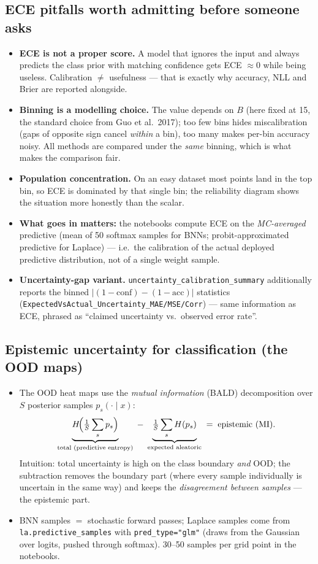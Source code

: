 \documentclass[10pt,a4paper]{article}
\newcommand{\code}[1]{\texttt{#1}}
\begin{document}
\subsection{ECE pitfalls worth admitting before someone asks}
\begin{itemize}
\item \textbf{ECE is not a proper score.} A model that ignores the input and always predicts the
  class prior with matching confidence gets ECE $\approx 0$ while being useless. Calibration
  $\ne$ usefulness --- that is exactly why accuracy, NLL and Brier are reported alongside.
\item \textbf{Binning is a modelling choice.} The value depends on $B$ (here fixed at 15,
  the standard choice from Guo et al.\ 2017); too few bins hides miscalibration
  (gaps of opposite sign cancel \emph{within} a bin), too many makes per-bin accuracy noisy.
  All methods are compared under the \emph{same} binning, which is what makes the comparison fair.
\item \textbf{Population concentration.} On an easy dataset most points land in the top bin, so ECE
  is dominated by that single bin; the reliability diagram shows the situation more honestly than
  the scalar.
\item \textbf{What goes in matters:} the notebooks compute ECE on the \emph{MC-averaged} predictive
  (mean of 50 softmax samples for BNNs; probit-approximated predictive for Laplace) --- i.e.\ the
  calibration of the actual deployed predictive distribution, not of a single weight sample.
\item \textbf{Uncertainty-gap variant.} \code{uncertainty\_calibration\_summary} additionally
  reports the binned $|(1-\mathrm{conf})-(1-\mathrm{acc})|$ statistics
  (\code{ExpectedVsActual\_Uncertainty\_MAE/MSE/Corr}) --- same information as ECE, phrased as
  ``claimed uncertainty vs.\ observed error rate''.
\end{itemize}

\subsection{Epistemic uncertainty for classification (the OOD maps)}
\begin{itemize}
\item The OOD heat maps use the \emph{mutual information} (BALD) decomposition over $S$ posterior
  samples $p_s(\cdot\mid x)$:
  \[
  \underbrace{H\!\Bigl(\tfrac1S\sum_s p_s\Bigr)}_{\text{total (predictive entropy)}}
  \;-\;
  \underbrace{\tfrac1S\sum_s H(p_s)}_{\text{expected aleatoric}}
  \;=\;
  \text{epistemic (MI)} .
  \]
  Intuition: total uncertainty is high on the class boundary \emph{and} OOD; the subtraction removes
  the boundary part (where every sample individually is uncertain in the same way) and keeps the
  \emph{disagreement between samples} --- the epistemic part.
\item BNN samples $=$ stochastic forward passes; Laplace samples come from
  \code{la.predictive\_samples} with \code{pred\_type="glm"} (draws from the Gaussian over logits,
  pushed through softmax). 30--50 samples per grid point in the notebooks.
\end{itemize}
\end{document}
